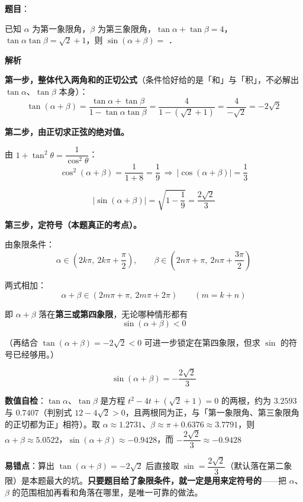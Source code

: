 \begin{answer}

\textbf{题目}：

已知 $\alpha$ 为第一象限角，$\beta$ 为第三象限角，$\tan\alpha+\tan\beta=4$，$\tan\alpha\tan\beta=\sqrt2+1$，则 $\sin(\alpha+\beta)=$ \gkblank{}．

\textbf{解析}

\textbf{第一步，整体代入两角和的正切公式}（条件恰好给的是「和」与「积」，不必解出 $\tan\alpha$、$\tan\beta$ 本身）：
\nopagebreak[4]
\[\tan(\alpha+\beta)=\frac{\tan\alpha+\tan\beta}{1-\tan\alpha\tan\beta}=\frac4{1-\left(\sqrt2+1\right)}=\frac4{-\sqrt2}=-2\sqrt2\]

\textbf{第二步，由正切求正弦的绝对值。}

由 $1+\tan^{2}\theta=\dfrac1{\cos^{2}\theta}$：
\nopagebreak[4]
\[\cos^{2}(\alpha+\beta)=\frac1{1+8}=\frac19\ \Longrightarrow\ |\cos(\alpha+\beta)|=\frac13\]

\nopagebreak[4]
\[|\sin(\alpha+\beta)|=\sqrt{1-\frac19}=\frac{2\sqrt2}3\]

\textbf{第三步，定符号（本题真正的考点）。}

由象限条件：
\nopagebreak[4]
\[\alpha\in\left(2k\pi,\ 2k\pi+\frac\pi2\right),\qquad \beta\in\left(2n\pi+\pi,\ 2n\pi+\frac{3\pi}2\right)\]

两式相加：
\nopagebreak[4]
\[\alpha+\beta\in\left(2m\pi+\pi,\ 2m\pi+2\pi\right)\qquad(m=k+n)\]

即 $\alpha+\beta$ 落在\textbf{第三或第四象限}，无论哪种情形都有
\nopagebreak[4]
\[\sin(\alpha+\beta)<0\]

（再结合 $\tan(\alpha+\beta)=-2\sqrt2<0$ 可进一步锁定在第四象限，但求 $\sin$ 的符号已经够用。）

\nopagebreak[4]
\[\sin(\alpha+\beta)=-\frac{2\sqrt2}3\]

\begin{gktip}
\textbf{数值自检}：$\tan\alpha$、$\tan\beta$ 是方程 $t^{2}-4t+\left(\sqrt2+1\right)=0$ 的两根，约为 $3.2593$ 与 $0.7407$（判别式 $12-4\sqrt2>0$，且两根同为正，与「第一象限角、第三象限角的正切都为正」相符）。取 $\alpha\approx1.2731$、$\beta\approx\pi+0.6376\approx3.7791$，则 $\alpha+\beta\approx5.0522$，$\sin(\alpha+\beta)\approx-0.9428$，而 $-\dfrac{2\sqrt2}3\approx-0.9428$ 

\textbf{易错点}：算出 $\tan(\alpha+\beta)=-2\sqrt2$ 后直接取 $\sin=\dfrac{2\sqrt2}3$（默认落在第二象限）是本题最大的坑。\textbf{只要题目给了象限条件，就一定是用来定符号的}——把 $\alpha$、$\beta$ 的范围相加再看和角落在哪里，是唯一可靠的做法。
\end{gktip}


\par\medskip

\end{answer}
